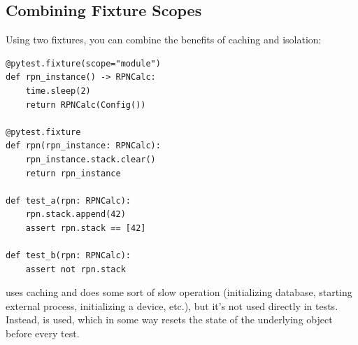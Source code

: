 
\subsection{Combining Fixture Scopes}

Using two fixtures, you can combine the benefits of caching and isolation:

\begin{verbatim}
@pytest.fixture(scope="module")
def rpn_instance() -> RPNCalc:
    time.sleep(2)
    return RPNCalc(Config())

@pytest.fixture
def rpn(rpn_instance: RPNCalc):
    rpn_instance.stack.clear()
    return rpn_instance

def test_a(rpn: RPNCalc):
    rpn.stack.append(42)
    assert rpn.stack == [42]

def test_b(rpn: RPNCalc):
    assert not rpn.stack
\end{verbatim}

 uses caching and does some sort of slow operation
(initializing database, starting external process, initializing a device, etc.),
but it's not used directly in tests. Instead,  is used, which in some
way resets the state of the underlying object before every test.

\begin{center}
\end{center}
\pagebreak
